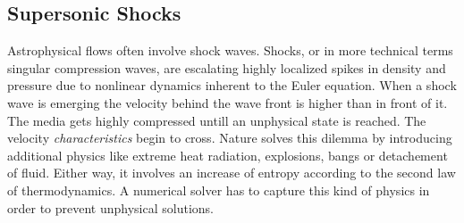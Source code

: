 \subsection{Supersonic Shocks}
\label{sec:theory-shocks}
Astrophysical flows often involve shock waves. Shocks, or in more technical
terms singular compression waves, are escalating highly localized spikes in
density and pressure due to nonlinear dynamics inherent to the Euler equation.
When a shock wave is emerging the velocity behind the wave front is higher than
in front of it. The media gets highly compressed untill an unphysical state is
reached. The velocity \emph{characteristics} begin to cross. Nature solves this
dilemma by introducing additional physics like extreme heat radiation,
explosions, bangs or detachement of fluid. Either way, it involves an increase
of entropy according to the second law of thermodynamics. A numerical solver
has to capture this kind of physics in order to prevent unphysical solutions. 

